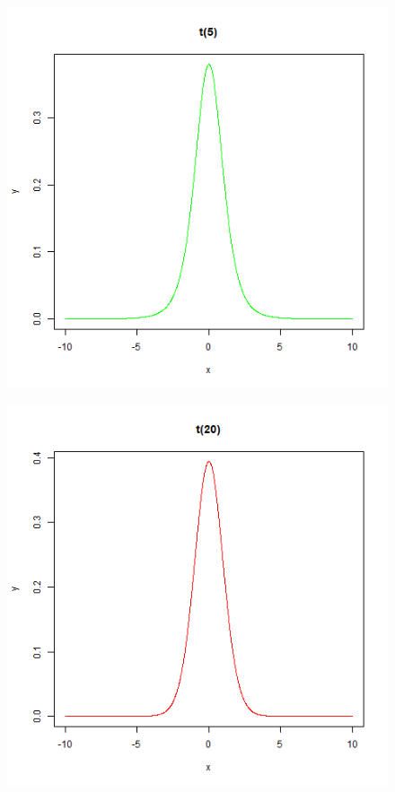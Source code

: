 \documentclass{article}
\begin{document}
\begin{figure}[h!]
\begin{center}
\includegraphics[height=0.44\textheight, angle=0]{"Student5.png"}
\end{center}
\end{figure}

\begin{figure}[h!]
\begin{center}
\includegraphics[height=0.44\textheight, angle=0]{"Student20.png"}
\end{center}
\end{figure}
\end{document}
